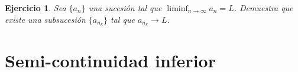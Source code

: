 \documentclass[11pt]{report}
\newtheorem{ex}{Ejercicio}
\begin{document}
\begin{ex}
  Sea \( \{a_n\} \) una sucesión tal que \( \liminf_{n \to \infty} a_n = L \). Demuestra que existe una subsucesión \( \{a_{n_k}\} \) tal que \( a_{n_k} \to L \).



\end{ex}

\section{Semi-continuidad inferior}
\end{document}
